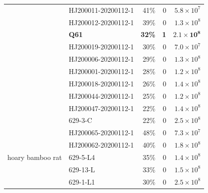 \documentclass[9pt,twocolumn,twoside]{gsajnl_modified}
\begin{document}
\begin{table}
{\begin{tabular}{llrrr}
                 & HJ200011-20200112-1 &                                41\% &                        0 &                   $5.8 \times 10^7$ \\
                 & HJ200012-20200112-1 &                                39\% &                        0 &                   $1.3 \times 10^8$ \\
                 & {\bf Q61} &                                {\bf 32\%} &                        {\bf 1} &                   $\mathbf{2.1 \times 10^8}$ \\
                 & HJ200019-20200112-1 &                                30\% &                        0 &                     $7.0 \times 10^7$ \\
                 & HJ200006-20200112-1 &                                29\% &                        0 &                   $1.3 \times 10^8$ \\
                 & HJ200001-20200112-1 &                                28\% &                        0 &                   $1.2 \times 10^8$ \\
                 & HJ200018-20200112-1 &                                26\% &                        0 &                   $1.4 \times 10^8$ \\
                 & HJ200044-20200112-1 &                                25\% &                        0 &                   $1.2 \times 10^8$ \\
                 & HJ200047-20200112-1 &                                22\% &                        0 &                   $1.4 \times 10^8$ \\
                 & 629-3-C &                                22\% &                        0 &                   $2.5 \times 10^8$ \\
\cline{1-5}
\multirow{6}{*}{hoary bamboo rat} & HJ200065-20200112-1 &                                48\% &                        0 &                   $7.3 \times 10^7$ \\
                 & HJ200062-20200112-1 &                                40\% &                        0 &                   $1.8 \times 10^8$ \\
                 & 629-5-L4 &                                35\% &                        0 &                   $1.4 \times 10^8$ \\
                 & 629-13-L &                                33\% &                        0 &                   $1.5 \times 10^8$ \\
                 & 629-1-L1 &                                30\% &                        0 &                   $2.5 \times 10^8$ \\

\end{tabular}}
\end{table}
\end{document}
